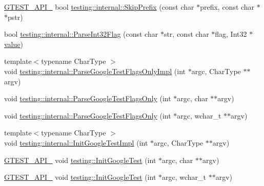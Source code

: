 \begin{DoxyCompactItemize}
\item 
\mbox{\hyperlink{_obj__test_2lib_2googletest-release-1_88_81_2googletest_2include_2gtest_2internal_2gtest-port_8h_aa73be6f0ba4a7456180a94904ce17790}{G\+T\+E\+S\+T\+\_\+\+A\+P\+I\+\_\+}} bool \mbox{\hyperlink{namespacetesting_1_1internal_a244d9a3765727306b597b8992ab84036}{testing\+::internal\+::\+Skip\+Prefix}} (const char $\ast$prefix, const char $\ast$$\ast$pstr)
\item 
bool \mbox{\hyperlink{namespacetesting_1_1internal_ae3449e173767750b613114ceac6d916a}{testing\+::internal\+::\+Parse\+Int32\+Flag}} (const char $\ast$str, const char $\ast$flag, Int32 $\ast$\mbox{\hyperlink{_obj__test_2lib_2googletest-master_2googlemock_2test_2gmock-matchers__test_8cc_a337b8a670efc0b086ad3af163f3121b6}{value}})
\item 
{\footnotesize template$<$typename Char\+Type $>$ }\\void \mbox{\hyperlink{namespacetesting_1_1internal_ae4c46ce8c3d016848fff52cc5133f2ac}{testing\+::internal\+::\+Parse\+Google\+Test\+Flags\+Only\+Impl}} (int $\ast$argc, Char\+Type $\ast$$\ast$argv)
\item 
void \mbox{\hyperlink{namespacetesting_1_1internal_a472880afbcc592a41e3d623e2dec8412}{testing\+::internal\+::\+Parse\+Google\+Test\+Flags\+Only}} (int $\ast$argc, char $\ast$$\ast$argv)
\item 
void \mbox{\hyperlink{namespacetesting_1_1internal_aa3c81a67914856448d0778990d9d9cab}{testing\+::internal\+::\+Parse\+Google\+Test\+Flags\+Only}} (int $\ast$argc, wchar\+\_\+t $\ast$$\ast$argv)
\item 
{\footnotesize template$<$typename Char\+Type $>$ }\\void \mbox{\hyperlink{namespacetesting_1_1internal_ac3c6fa93391768aa91c6238b31aaeeb5}{testing\+::internal\+::\+Init\+Google\+Test\+Impl}} (int $\ast$argc, Char\+Type $\ast$$\ast$argv)
\item 
\mbox{\hyperlink{_obj__test_2lib_2googletest-release-1_88_81_2googletest_2include_2gtest_2internal_2gtest-port_8h_aa73be6f0ba4a7456180a94904ce17790}{G\+T\+E\+S\+T\+\_\+\+A\+P\+I\+\_\+}} void \mbox{\hyperlink{namespacetesting_afd726ae08c9bd16dc52f78c822d9946b}{testing\+::\+Init\+Google\+Test}} (int $\ast$argc, char $\ast$$\ast$argv)
\item 
\mbox{\hyperlink{_obj__test_2lib_2googletest-release-1_88_81_2googletest_2include_2gtest_2internal_2gtest-port_8h_aa73be6f0ba4a7456180a94904ce17790}{G\+T\+E\+S\+T\+\_\+\+A\+P\+I\+\_\+}} void \mbox{\hyperlink{namespacetesting_ae5a88709a4a7529e30c83242156556b3}{testing\+::\+Init\+Google\+Test}} (int $\ast$argc, wchar\+\_\+t $\ast$$\ast$argv)
$$
\end{DoxyCompactItemize}
